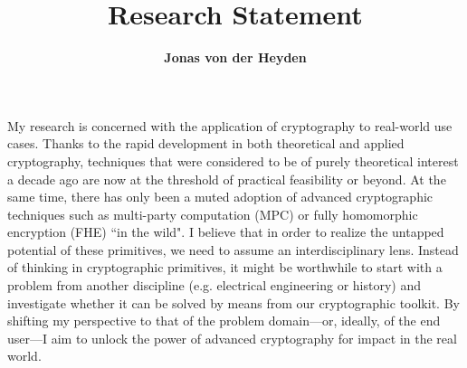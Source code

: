 \documentclass{article}
\title{\textbf{Research Statement}}
\author{\textbf{Jonas von der Heyden}}
\date{}
\begin{document}
\maketitle

My research is concerned with the application of cryptography to real-world use cases. Thanks to the rapid development in both theoretical and applied cryptography, techniques that were considered to be of purely theoretical interest a decade ago are now at the threshold of practical feasibility or beyond. At the same time, there has only been a muted adoption of advanced cryptographic techniques such as multi-party computation (MPC) or fully homomorphic encryption (FHE) ``in the wild". I believe that in order to realize the untapped potential of these primitives, we need to assume an interdisciplinary lens. Instead of thinking in cryptographic primitives, it might be worthwhile to start with a problem from another discipline (e.g. electrical engineering or history) and investigate whether it can be solved by means from our cryptographic toolkit. By shifting my perspective to that of the problem domain—or, ideally, of the end user—I aim to unlock the power of advanced cryptography for impact in the real world.
\end{document}
